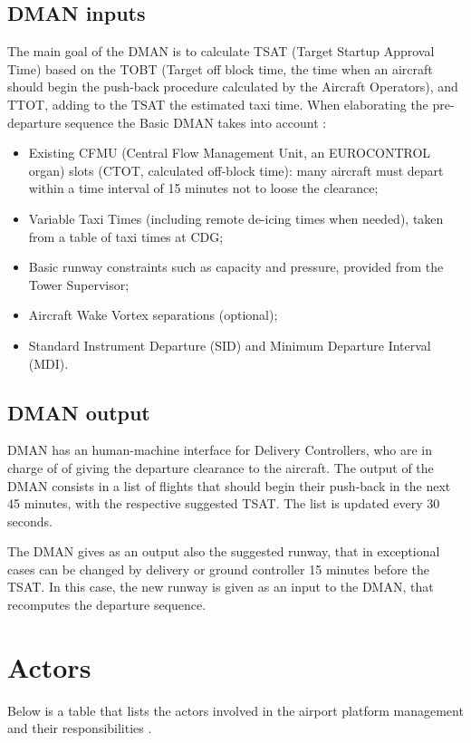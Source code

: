 \documentclass{article}
\begin{document}
\subsection{DMAN inputs}
The main goal of the DMAN is to calculate TSAT (Target Startup Approval Time) based on the TOBT (Target off block time, the time when an aircraft should begin the push-back procedure calculated by the Aircraft Operators), and TTOT, adding to the TSAT the estimated taxi time. 
When elaborating the pre-departure sequence the Basic DMAN takes into account \cite{DMAN}:
\begin{itemize}
\item Existing CFMU (Central Flow Management Unit, an EUROCONTROL organ) slots (CTOT, calculated off-block time): many aircraft must depart within a time interval of 15 minutes not to loose the clearance;
\item Variable Taxi Times (including remote de-icing times when needed), taken from a table of taxi times at CDG;
\item Basic runway constraints such as capacity and pressure, provided from the Tower Supervisor;
\item Aircraft Wake Vortex separations (optional);
\item Standard Instrument Departure (SID) and Minimum Departure Interval (MDI).
\end{itemize}

\subsection{DMAN output}

DMAN has an human-machine interface for Delivery Controllers, who are in charge of  of giving the departure clearance to the aircraft. The output of the DMAN consists in a list of flights that should begin their push-back in the next 45 minutes, with the respective suggested TSAT. The list is updated every 30 seconds.

The DMAN gives as an output also the suggested runway, that in exceptional cases can be changed by delivery or ground controller 15 minutes before the TSAT. In this case, the new runway is given as an input to the DMAN, that recomputes the departure sequence. 


\section{Actors}
Below is a table that lists the actors involved in the airport platform management and their responsibilities \cite{DMAN}.
\end{document}

